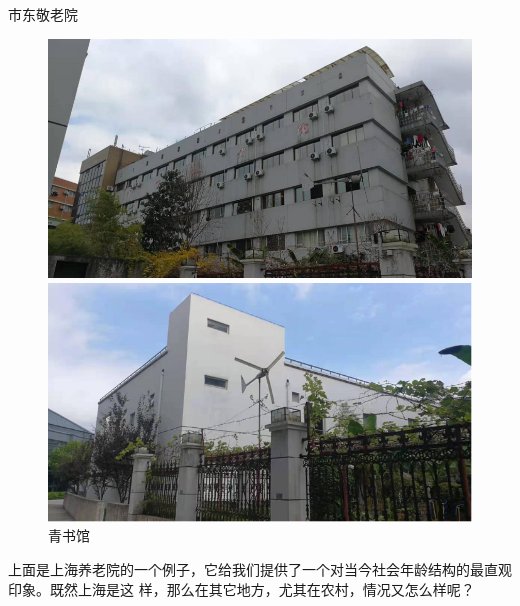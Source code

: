 \documentclass[presentation]{beamer}
\begin{document}
\begin{frame}[label={sec:orgdf90e72}]{市东敬老院}
\begin{figure}[ht]
    \begin{minipage}[b]{0.45\linewidth}
        \centering
        \includegraphics[width=\textwidth]{2}
        \caption*{市东敬老院}
        \label{fig:a}
    \end{minipage}
    \hspace{0.5cm}
    \begin{minipage}[b]{0.45\linewidth}
        \centering
        \includegraphics[width=\textwidth]{1}
        \caption*{青书馆}
        \label{fig:b}
    \end{minipage}
\end{figure}
\end{frame}

\begin{frame}[label={sec:org18d26bf}]{​}
上面是上海养老院的一个例子，它给我们提供了一个对当今社会年龄结构的最直观印象。既然上海是这
样，那么在其它地方，尤其在农村，情况又怎么样呢？
\end{frame}
\end{document}
